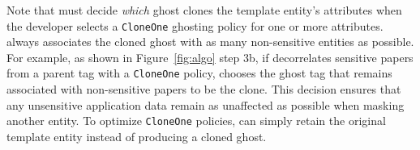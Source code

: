 Note that \sys must decide \emph{which} ghost clones the template entity's attributes when the
developer selects a \texttt{CloneOne} ghosting policy for one or more attributes. \sys always
associates the cloned ghost with as many non-sensitive entities as possible. For example, as shown
in Figure~\ref{fig:algo} step 3b, if \sys decorrelates sensitive papers from a parent tag with a
\texttt{CloneOne} policy, \sys chooses the ghost tag that remains associated with non-sensitive
papers to be the clone. This decision ensures that any unsensitive application
data remain as unaffected as possible when masking another entity.
To optimize
\texttt{CloneOne} policies, \sys can simply retain the original template entity instead of producing
a cloned ghost.
\fi


